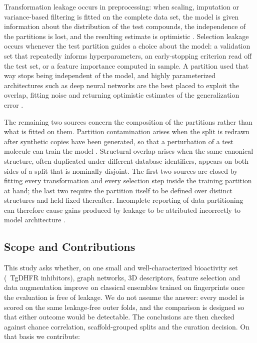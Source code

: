 Transformation leakage occurs in preprocessing: when scaling, imputation or variance-based filtering is fitted on the
complete data set, the model is given information about the distribution of the test compounds, the independence of the
partitions is lost, and the resulting estimate is optimistic \citep{correa2025, lewis2023}. Selection leakage occurs
whenever the test partition guides a choice about the model: a validation set that repeatedly informs hyperparameters,
an early-stopping criterion read off the test set, or a feature importance computed in sample. A partition used that
way stops being independent of the model, and highly parameterized architectures such as deep neural networks are the
best placed to exploit the overlap, fitting noise and returning optimistic estimates of the generalization error
\citep{bauman2014, sotirios2025}.

The remaining two sources concern the composition of the partitions rather than what is fitted on them. Partition
contamination arises when the split is redrawn after synthetic copies have been generated, so that a perturbation of a
test molecule can train the model \citep{gerz2026, john2025}. Structural overlap arises when the same canonical
structure, often duplicated under different database identifiers, appears on both sides of a split that is nominally
disjoint. The first two sources are closed by fitting every transformation and every selection step inside the
training partition at hand; the last two require the partition itself to be defined over distinct structures and held
fixed thereafter. Incomplete reporting of data partitioning can therefore cause gains produced by leakage to be
attributed incorrectly to model architecture \citep{rojas2026}.


\subsection{Scope and Contributions}

This study asks whether, on one small and well-characterized bioactivity set (\NCompounds\ TgDHFR inhibitors), graph
networks, 3D descriptors, feature selection and data augmentation improve on classical ensembles trained on
fingerprints once the evaluation is free of leakage. We do not assume the answer: every model is scored on the same
leakage-free outer folds, and the comparison is designed so that either outcome would be detectable. The conclusions
are then checked against chance correlation, scaffold-grouped splits and the curation decision. On that basis we
contribute:

